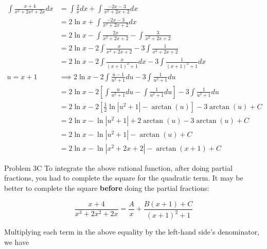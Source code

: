 \documentclass{article}
\begin{document}
    \begin{align*}
        \int \frac{x+4}{x^3+2x^2+2x}dx  &= \int \frac{2}{x} dx + \int \frac{-2x-3}{x^2+2x+2}dx \\
                                        &= 2\ln{x} + \int \frac{-2x-3}{x^2+2x+2}dx \\
                                        &= 2\ln{x} - \int \frac{2x}{x^2+2x+2} - \int \frac{3}{x^2+2x+2} \\
                                        &= 2\ln{x} - 2\int\frac{x}{x^2+2x+2} - 3\int\frac{1}{x^2+2x+2} \\
                                        &= 2\ln{x} - 2\int \frac{x}{\left(x+1\right)^2 + 1}dx - 3\int\frac{1}{\left(x+1\right)^2+1}dx \\
        u = x+1                         &\implies 2\ln{x} - 2\int \frac{u-1}{u^2 + 1}du - 3\int \frac{1}{u^2+1}du \\
                                        &= 2\ln{x} - 2\left[\int \frac{u}{u^2+1}du-\int\frac{1}{u^2+1}du\right]-3\int\frac{1}{u^2+1}du \\
                                        &= 2\ln{x} - 2\left[\frac{1}{2}\ln{\left|u^2+1\right|}-\arctan{(u)}\right]-3\arctan{(u)} + C \\
                                        &= 2\ln{x} -\ln{\left|u^2+1\right|} + 2\arctan{(u)}-3\arctan{(u)} + C \\
                                        &= 2\ln{x} -\ln{\left|u^2+1\right|} -\arctan{(u)} + C \\
                                        &= 2\ln{x} - \ln{\left|x^2+2x+2\right|}-\arctan{(x+1)} + C
    \end{align*}

    \pagebreak
    \thispagestyle{5}


    \begin{tbhtheorem}{Problem 3C}
        To integrate the above rational function, after doing partial fractions, you had to complete the square for the quadratic term. It may be better to complete the square \textbf{before} doing the partial fractions:

        \[
            \frac{x+4}{x^3+2x^2+2x} = \frac{A}{x} + \frac{B(x+1)+C}{\left(x+1\right)^2+1}
        \]
    \end{tbhtheorem}

    Multiplying each term in the above equality by the left-hand side's denominator, we have
\end{document}
